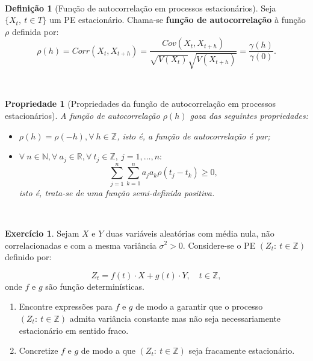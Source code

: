 \documentclass[
  11pt,
  a4paper,
]{book}
\newtheorem{proposition}{Propriedade}[chapter]
\theoremstyle{definition}
\newtheorem{definition}{Definição}[chapter]
\theoremstyle{definition}
\theoremstyle{definition}
\newtheorem{exercise}{Exercício}[chapter]
\theoremstyle{definition}
\theoremstyle{remark}
\begin{document}
\(\,\)

\begin{definition}[Função de autocorrelação em processos estacionários]
Seja \(\{X_t, ~ t \in T\}\) um PE estacionário. Chama-se \textbf{função de autocorrelação} à função
\(\rho\) definida por:
\[\rho(h)=Corr(X_t,X_{t+h})=\dfrac{Cov(X_t,X_{t+h})}{\sqrt{V(X_t)}\sqrt{V(X_{t+h})}}=\dfrac{\gamma(h)}{\gamma(0)}.\]
\end{definition}

\(\,\)

\begin{proposition}[Propriedades da função de autocorrelação em processos estacionários]

A função de autocorrelação \(\rho(h)\) goza das seguintes propriedades:

\begin{itemize}
\item
  \(\rho(h)=\rho(-h), \forall ~h \in \mathbb{Z}\), isto é, a função de autocorrelação é
  par;
\item
  \(\forall ~n \in \mathbb{N}, \forall ~a_j \in \mathbb{R}, \forall ~t_j \in \mathbb{Z}, ~j=1, \ldots,n:\)
  \[\sum\limits_{j=1}^{n}\sum\limits_{k=1}^{n} a_ja_k\rho(t_j-t_k) \geq 0,\] isto é,
  trata-se de uma função semi-definida positiva.
\end{itemize}

\end{proposition}

\(\,\)

\begin{exercise}
\leavevmode

Sejam \(X\) e \(Y\) duas variáveis aleatórias com média nula, não correlacionadas e com a mesma variância \(\sigma^2>0\). Considere-se o PE \((Z_t: ~t \in \mathbb{Z})\) definido por:

\[Z_t=f(t) \cdot X + g(t) \cdot Y, \quad t \in \mathbb{Z},\]
onde \(f\) e \(g\) são função determinísticas.

\begin{enumerate}
\def\labelenumi{(\alph{enumi})}
\item
  Encontre expressões para \(f\) e \(g\) de modo a garantir que o processo \((Z_t: ~t \in \mathbb{Z})\) admita variância constante mas não seja necessariamente estacionário em sentido fraco.
\item
  Concretize \(f\) e \(g\) de modo a que \((Z_t: ~t \in \mathbb{Z})\) seja fracamente estacionário.
\end{enumerate}

\end{exercise}
\end{document}
